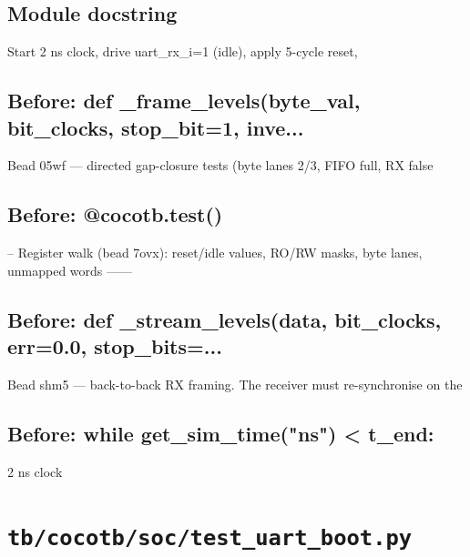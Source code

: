 \begin{record}

\subsection*{Module docstring}

\begin{textblock}
Start 2 ns clock, drive uart_rx_i=1 (idle), apply 5-cycle reset,
\end{textblock}

\subsection*{Before: def \_frame\_levels(byte\_val, bit\_clocks, stop\_bit=1, inve...}

\begin{textblock}
Bead 05wf — directed gap-closure tests (byte lanes 2/3, FIFO full, RX false
\end{textblock}

\subsection*{Before: @cocotb.test()}

\begin{textblock}
-- Register walk (bead 7ovx): reset/idle values, RO/RW masks, byte lanes, unmapped words ------
\end{textblock}

\subsection*{Before: def \_stream\_levels(data, bit\_clocks, err=0.0, stop\_bits=...}

\begin{textblock}
Bead shm5 — back-to-back RX framing.  The receiver must re-synchronise on the
\end{textblock}

\subsection*{Before: while get\_sim\_time("ns") < t\_end:}

\begin{textblock}
2 ns clock
\end{textblock}

\end{record}

\section{\texttt{tb/cocotb/soc/test\_uart\_boot.py}}\label{cr:suite:soc-test-uart-boot}

